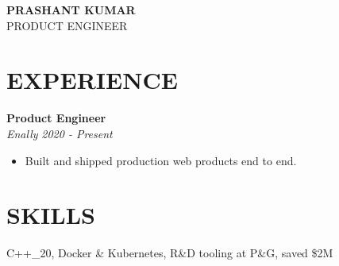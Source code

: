 \documentclass[a4paper,11pt]{article}
\begin{document}
\begin{center}{\Huge \textbf{PRASHANT KUMAR}}\\[4pt]
{\large PRODUCT ENGINEER}\\[6pt]\end{center}
\section*{EXPERIENCE}
\textbf{Product Engineer} \\
\textit{Enally} \hfill \textit{2020 - Present}
\begin{itemize}
  \item Built and shipped production web products end to end.
\end{itemize}
\section*{SKILLS}
C++\_20, Docker \& Kubernetes, R\&D tooling at P\&G, saved \$2M
\end{document}
